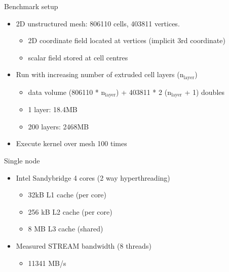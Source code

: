\documentclass[bigger]{beamer}
\begin{document}
\begin{frame}[label={sec:orgheadline17}]{Benchmark setup}
\begin{itemize}
\item 2D unstructured mesh: 806110 cells, 403811 vertices.
\begin{itemize}
\item 2D coordinate field located at vertices (implicit 3rd coordinate)
\item scalar field stored at cell centres
\end{itemize}
\item Run with increasing number of extruded cell layers (n\(_{\text{layer}}\))
\begin{itemize}
\item data volume
(806110 * n\(_{\text{layer}}\)) + 403811 * 2 (n\(_{\text{layer}}\) + 1) doubles
\item 1 layer: 18.4MB
\item 200 layers: 2468MB
\end{itemize}
\item Execute kernel over mesh 100 times
\end{itemize}
\end{frame}

\begin{frame}[label={sec:orgheadline18}]{Single node}
\begin{itemize}
\item Intel Sandybridge 4 cores (2 way hyperthreading)
\begin{itemize}
\item 32kB L1 cache (per core)
\item 256 kB L2 cache (per core)
\item 8 MB L3 cache (shared)
\end{itemize}
\item Measured STREAM bandwidth (8 threads)
\begin{itemize}
\item 11341 MB/s
\end{itemize}
\end{itemize}
\end{frame}
\end{document}
